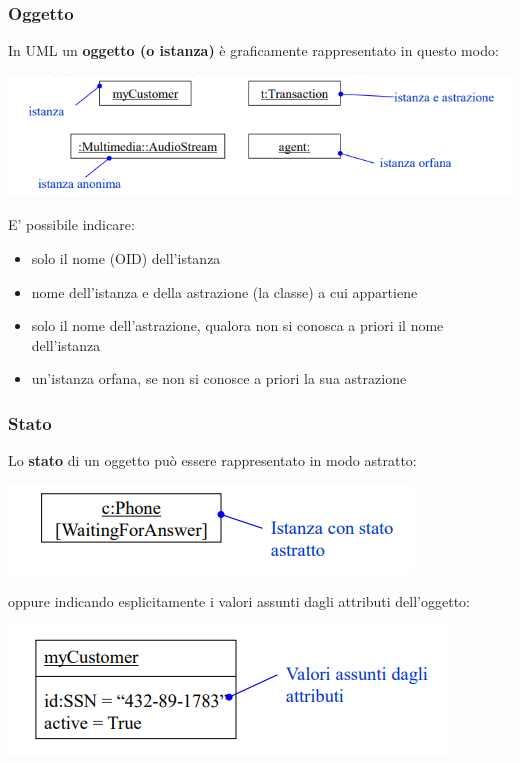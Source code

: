 \documentclass{article}
\begin{document}
	\subsubsection{Oggetto}
	In UML un \textbf{oggetto (o istanza)} è graficamente rappresentato in questo modo:
	\begin{center}
		\includegraphics[scale=0.8]{assets/uml_oggetto.png}
	\end{center}
	E' possibile indicare:
	\begin{itemize}
		\item solo il nome (OID) dell'istanza
		\item nome dell'istanza e della astrazione (la classe) a cui appartiene
		\item solo il nome dell'astrazione, qualora non si conosca a priori il nome dell'istanza
		\item un'istanza orfana, se non si conosce a priori la sua astrazione
	\end{itemize}

	\subsubsection{Stato}
	Lo \textbf{stato} di un oggetto può essere rappresentato in modo astratto:
	\begin{center}
		\includegraphics[scale=0.8]{assets/uml_stato.png}
	\end{center}
	oppure indicando esplicitamente i valori assunti dagli attributi dell'oggetto:
	\begin{center}
		\includegraphics[scale=0.8]{assets/uml_stato_esplicito.png}
	\end{center}
\end{document}
